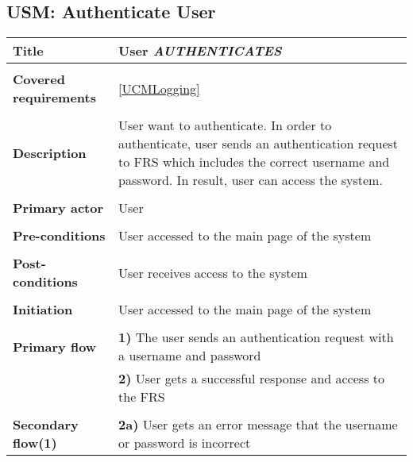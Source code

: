 \documentclass[a4paper,11pt]{article}
\begin{document}
\subsection{USM: Authenticate User}
 
\begin{tabular}{|p{3.5cm}|p{11.5cm}|} \hline 
    \textbf{Title} &   User \emph{AUTHENTICATES}  
    
    \\ \hline \rowcolor{Gray} & \\ \hline 
  
    \textbf{Covered requirements} & \ref{UCMLogging}
  
    \\ \hline \rowcolor{Gray} & \\ \hline 
  
    \textbf{Description} &  User want to authenticate. In order to authenticate, user sends an authentication request to FRS which includes the correct username and password. In result, user can access the system. 
   
    \\ \hline \rowcolor{Gray} & \\ \hline 
   
    \textbf{Primary actor} & User   
   
    \\ \hline \rowcolor{Gray} & \\ \hline  
   
    \textbf{Pre-conditions} &   User accessed to the main page of the system 
   
    \\ \hline \rowcolor{Gray} & \\ \hline 
   
    \textbf{Post-conditions} &   User receives access to the system 
   
    \\ \hline \rowcolor{Gray} & \\ \hline  
   
    \textbf{Initiation} & User accessed to the main page of the system 
   
    \\ \hline \rowcolor{Gray} & \\ \hline  
   
    \textbf{Primary flow} &  
    \textbf{1)} The user sends an authentication request with a username and password  \\& 
    \textbf{2)} User gets a successful response and access to the FRS
   
    \\ \hline \rowcolor{Gray} & \\ \hline  
   
    \textbf{Secondary flow(1)} &  
    \textbf{2a)} User gets an error message that the username or password is incorrect
    
    \\ \hline   
\end{tabular} 
\end{document}
